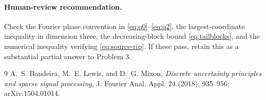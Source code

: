 \documentclass[11pt]{article}
\theoremstyle{remark}
\newcommand{\1}{\mathbf 1}
\begin{document}
\paragraph{Human-review recommendation.}
Check the Fourier phase convention in \eqref{eq:q0}--\eqref{eq:q2}, the
largest-coordinate inequality in dimension three, the decreasing-block bound
\eqref{eq:tailblocks}, and the numerical inequality verifying
\eqref{eq:source-rip}.  If these pass, retain this as a substantial partial
answer to Problem 3.

\begin{thebibliography}{9}
A.~S. Bandeira, M.~E. Lewis, and D.~G. Mixon,
\emph{Discrete uncertainty principles and sparse signal processing},
J. Fourier Anal. Appl. 24 (2018), 935--956; arXiv:1504.01014.
\end{thebibliography}
\end{document}
